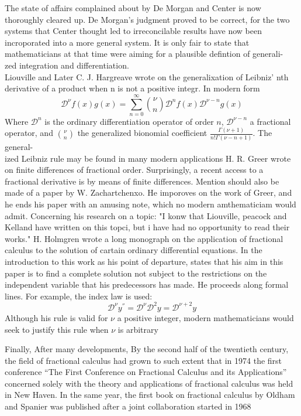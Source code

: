 \documentclass[twoside]{book}
\begin{document}
{The state of affairs complained about by De Morgan and Center is now thoroughly cleared up. De Morgan's judgment proved to be correct, for the two systems that Center thought led to irreconcilable results have now been incroporated into a more general system. It is only fair to state that mathematicians at that time were aiming for a plausible defintion of generali-\\zed integration and differentiation.\\
\newline
Liouville and Later C. J. Hargreave wrote on the generalixation of Leibniz' nth derivative of a product when n is not a positive integr. In modern form
$$\mathcal{D}^{\nu}f(x) g(x) = \sum_{n=0}^{\infty} {\nu \choose n} \mathcal{D}^n f(x) \mathcal{D}^{\nu-n}g(x) $$
Where $\mathcal{D}^n$ is the ordinary differentiation operator of order $n$, $\mathcal{D}^{\nu -n}$ a fractional operator, and ${\nu \choose n}$ the generalized bionomial coefficient $\frac{\Gamma{(\nu+1)}}{n! \Gamma{(\nu-n+1)}}$. The general-\\ized Leibniz rule may be found in many modern applications H. R. Greer wrote on finite differences of fractional order. Surprisingly, a recent access to a fractional derivative is by means of finite differences. Mention should also be made of a paper by W. Zachartchenxo. He imporoves on the work of Greer, and he ends his paper with an amusing note, which no modern amthematiciam would admit. Concerning his research on a topic: "I konw that Liouville, peacock and Kelland have written on this topci, but i have had no opportunity to read their works." H. Holmgren wrote a long monograph on the application of fractional calculus to the solution of cartain ordinary differential equations. In the introduction to this work as his point of departure, states that his aim in this paper is to find a complete solution not subject to the restrictions on the independent variable that his predecessors has made. He proceeds along formal lines. For example, the index law is used:
$$\mathcal{D}^\nu y^{''} = \mathcal{D}^\nu \mathcal{D}^2 y= \mathcal{D}^{\nu+2}y$$
Although his rule is valid for $\nu$ a positive integer, modern mathematicians would seek to justify this rule when $\nu$ is arbitrary

Finally, After many developments, By the second half of the twentieth century, the field of fractional calculus had grown to such extent that in
1974 the first conference “The First Conference on Fractional Calculus and its Applications” concerned solely
with the theory and applications of fractional calculus was held in New Haven. In the same year, the first book
on fractional calculus by Oldham and Spanier was published after a joint collaboration started in 1968\\

}
\end{document}
